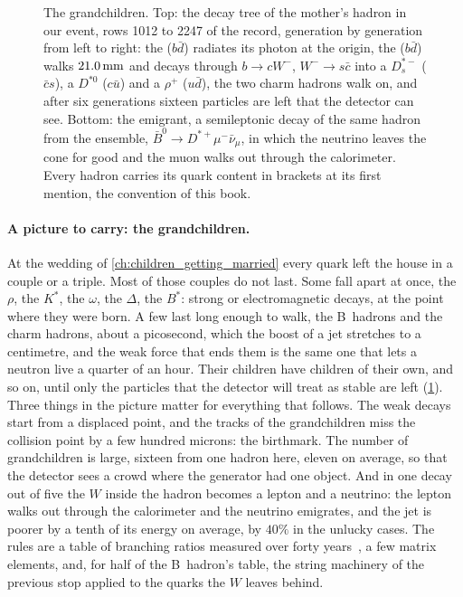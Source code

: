 \begin{figure}[htbp]\centering
\resizebox{\textwidth}{!}{}
\caption[The grandchildren: the decay tree of the mother's hadron and the
emigrant]{The grandchildren. Top: the decay tree of the mother's hadron in
our event, rows 1012 to 2247 of the record, generation by generation from
left to right: the \Bstarbar ($b\bar d$) radiates its photon at the
origin, the \Bbar ($b\bar d$) walks $21.0\,\mathrm{mm}$ and decays through
$b\to cW^-$, $W^-\to s\bar c$ into a $D_s^{*-}$ ($\bar cs$), a $D^{*0}$
($c\bar u$) and a $\rho^+$ ($u\bar d$), the two charm hadrons walk on, and
after six generations sixteen particles are left that the detector can
see. Bottom: the emigrant, a semileptonic decay of the same hadron from
the ensemble, $\bar B^0\to D^{*+}\mu^-\bar\nu_\mu$, in which the neutrino
leaves the cone for good and the muon walks out through the calorimeter.
Every hadron carries its quark content in brackets at its first mention,
the convention of this book.}
\label{fig:children_producing_grandchildren:family_sketch}
\end{figure}

\paragraph{A picture to carry: the grandchildren.} At the wedding of
\cref{ch:children_getting_married} every quark left the house in a couple
or a triple. Most of those couples do not last. Some fall apart at once,
the $\rho$, the $K^*$, the $\omega$, the $\Delta$, the $B^*$: strong or
electromagnetic decays, at the point where they were born. A few last long
enough to walk, the B~hadrons and the charm hadrons, about a picosecond,
which the boost of a jet stretches to a centimetre, and the weak force that
ends them is the same one that lets a neutron live a quarter of an hour.
Their children have children of their own, and so on, until only the
particles that the detector will treat as stable are left
(\cref{fig:children_producing_grandchildren:family_sketch}). Three things in
the picture matter for everything that follows. The weak decays start from
a displaced point, and the tracks of the grandchildren miss the collision
point by a few hundred microns: the birthmark. The number of grandchildren
is large, sixteen from one hadron here, eleven on average, so that the
detector sees a crowd where the generator had one object. And in one decay
out of five the $W$ inside the hadron becomes a lepton and a neutrino: the
lepton walks out through the calorimeter and the neutrino emigrates, and
the jet is poorer by a tenth of its energy on average, by $40\%$ in the
unlucky cases. The rules are a table of branching ratios measured over
forty years~\cite{ParticleDataGroup:2024cfk,HeavyFlavorAveragingGroupHFLAV:2024ctg},
a few matrix elements, and, for half of the B~hadron's table, the string
machinery of the previous stop applied to the quarks the $W$ leaves behind.

